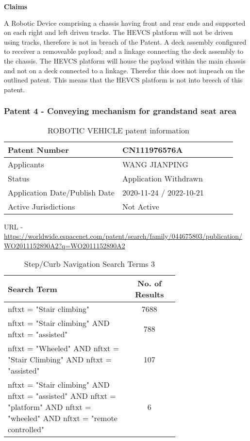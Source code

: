 \documentclass [12pt]{article}
\begin{document}
\textbf{Claims}

A Robotic Device comprising a chassis having front and rear ends and supported on each right and left driven tracks.
The HEVCS platform will not be driven using tracks, therefore is not in breach of the Patent.
A deck assembly configured to receiver a removeable payload; and a linkage connecting the deck assembly to the chassis.
The HEVCS platform will house the payload within the main chassis and not on a deck connected to a linkage. Therefor this does not impeach on the outlined patent.
This means that the HEVCS platform is not into breech of this patent.

\subsubsection{Patent 4 - Conveying mechanism for grandstand seat area}

\begin{table}[H]
    \centering
    \setlength{\arrayrulewidth}{1.5pt}
    \begin{tabular}{|p{0.5\linewidth}|p{0.5\linewidth}|}
    \hline
    Patent Number & CN111976576A\\
    \hline
    Applicants & WANG JIANPING\\
    \hline
    Status & Application Withdrawn\\
    \hline
    Application Date/Publish Date & 2020-11-24 / 2022-10-21\\
    \hline
    Active Jurisdictions & Not Active\\
    \hline
    \end{tabular}
    \caption{ROBOTIC VEHICLE patent information}
    \label{table:robotic_vehicle_patent_information}
\end{table}

URL - \url{https://worldwide.espacenet.com/patent/search/family/044675803/publication/WO2011152890A2?q=WO2011152890A2}

\begin{table}[H]
    \centering
    \setlength{\arrayrulewidth}{1.5pt}
    \begin{tabular}{|p{0.7\linewidth}|c|}
    \hline
    \cellcolor{gray!40}Search Term & \cellcolor{gray!40}No. of Results \\
    \hline
    nftxt = "Stair climbing" & 7688 \\
    \hline
    nftxt = "Stair climbing" AND nftxt = "assisted" & 788 \\
    \hline
    nftxt = "Wheeled" AND nftxt = "Stair Climbing" AND nftxt = "assisted" & 107 \\
    \hline
    nftxt = "Stair climbing" AND nftxt = "assisted" AND nftxt = "platform" AND nftxt = "wheeled" AND nftxt = "remote controlled"& 6 \\
    \hline
    \end{tabular}
    \caption{Step/Curb Navigation Search Terms 3}
    \label{table:step_curb_nav_st_3}
\end{table}
\end{document}
